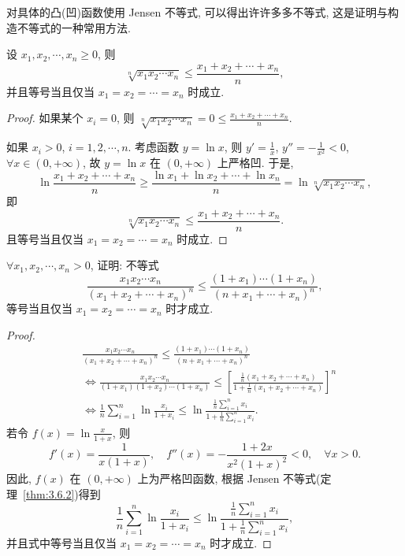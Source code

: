 对具体的凸(凹)函数使用 Jensen 不等式, 可以得出许许多多不等式, 这是证明与构造不等式的一种常用方法.

\begin{example}\label{ex:3.6.2}
设 $x_{1},x_{2},\cdots,x_{n}\geqslant 0$, 则
\[
\sqrt[n]{x_{1}x_{2}\cdots x_{n}}\leqslant\frac{x_{1}+x_{2}+\cdots+x_{n}}{n},
\]
并且等号当且仅当 $x_{1}=x_{2}=\cdots=x_{n}$ 时成立.
\end{example}

\begin{proof}
如果某个 $x_{i}=0$, 则 $\sqrt[n]{x_{1}x_{2}\cdots x_{n}}=0\leqslant\frac{x_{1}+x_{2}+\cdots+x_{n}}{n}$.

如果 $x_{i}>0$, $i=1,2,\cdots,n$. 考虑函数 $y=\ln x$, 则 $y'=\frac{1}{x}$, $y''=-\frac{1}{x^{2}}<0$, $\forall x\in(0,+\infty)$, 故 $y=\ln x$ 在 $(0,+\infty)$ 上严格凹. 于是,
\[
\ln\frac{x_{1}+x_{2}+\cdots+x_{n}}{n}\geqslant\frac{\ln x_{1}+\ln x_{2}+\cdots+\ln x_{n}}{n}=\ln\sqrt[n]{x_{1}x_{2}\cdots x_{n}},
\]
即
\[
\sqrt[n]{x_{1}x_{2}\cdots x_{n}}\leqslant\frac{x_{1}+x_{2}+\cdots+x_{n}}{n}.
\]
且等号当且仅当 $x_{1}=x_{2}=\cdots=x_{n}$ 时成立.
\end{proof}

\begin{example}\label{ex:3.6.3}
$\forall x_{1},x_{2},\cdots,x_{n}>0$, 证明: 不等式
\[
\frac{x_{1}x_{2}\cdots x_{n}}{(x_{1}+x_{2}+\cdots+x_{n})^{n}}\leqslant\frac{(1+x_{1})\cdots(1+x_{n})}{(n+x_{1}+\cdots+x_{n})^{n}},
\]
等号当且仅当 $x_{1}=x_{2}=\cdots=x_{n}$ 时才成立.
\end{example}

\begin{proof}
\begin{align*}
&\frac{x_{1}x_{2}\cdots x_{n}}{(x_{1}+x_{2}+\cdots+x_{n})^{n}}\leqslant\frac{(1+x_{1})\cdots(1+x_{n})}{(n+x_{1}+\cdots+x_{n})^{n}}\\
&\Longleftrightarrow \frac{x_{1}x_{2}\cdots x_{n}}{(1+x_{1})(1+x_{2})\cdots(1+x_{n})}\leqslant\left[\frac{\frac{1}{n}(x_{1}+x_{2}+\cdots+x_{n})}{1+\frac{1}{n}(x_{1}+x_{2}+\cdots+x_{n})}\right]^{n}\\
&\Longleftrightarrow \frac{1}{n}\sum_{i=1}^{n}\ln\frac{x_{i}}{1+x_{i}}\leqslant\ln\frac{\frac{1}{n}\sum_{i=1}^{n}x_{i}}{1+\frac{1}{n}\sum_{i=1}^{n}x_{i}}.
\end{align*}
若令 $f(x)=\ln\frac{x}{1+x}$, 则
\[
f'(x)=\frac{1}{x(1+x)},\quad f''(x)=-\frac{1+2x}{x^{2}(1+x)^{2}}<0,\quad\forall x>0.
\]
因此, $f(x)$ 在 $(0,+\infty)$ 上为严格凹函数, 根据 Jensen 不等式(定理~\ref{thm:3.6.2})得到
\[
\frac{1}{n}\sum_{i=1}^{n}\ln\frac{x_{i}}{1+x_{i}}\leqslant\ln\frac{\frac{1}{n}\sum_{i=1}^{n}x_{i}}{1+\frac{1}{n}\sum_{i=1}^{n}x_{i}},
\]
并且式中等号当且仅当 $x_{1}=x_{2}=\cdots=x_{n}$ 时才成立.
\end{proof}

